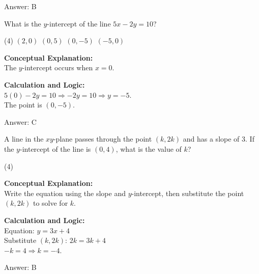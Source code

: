 \documentclass[11pt,paper=a4,answers]{exam}
\begin{document}
\begin{questions}
\begin{solution}
\vspace{15pt}
Answer: \colorbox{yellow!100}{B}
\end{solution}

\vspace{20pt}

\question
What is the $y$-intercept of the line $5x - 2y = 10$?
\begin{tasks}(4)
    \task $(2, 0)$
    \task $(0, 5)$
    \task $(0, -5)$
    \task $(-5, 0)$
\end{tasks}

\begin{solution}
\textbf{Conceptual Explanation:} \\
The $y$-intercept occurs when $x = 0$.

\vspace{10pt}
\textbf{Calculation and Logic:} \\
$5(0) - 2y = 10 \Rightarrow -2y = 10 \Rightarrow y = -5$. \\
The point is $(0, -5)$.

\vspace{15pt}
Answer: \colorbox{yellow!100}{C}
\end{solution}

\vspace{20pt}

\question
A line in the $xy$-plane passes through the point $(k, 2k)$ and has a slope of 3. If the $y$-intercept of the line is $(0, 4)$, what is the value of $k$?
\begin{tasks}(4)
\end{tasks}

\begin{solution}
\textbf{Conceptual Explanation:} \\
Write the equation using the slope and $y$-intercept, then substitute the point $(k, 2k)$ to solve for $k$.

\vspace{10pt}
\textbf{Calculation and Logic:} \\
Equation: $y = 3x + 4$ \\
Substitute $(k, 2k)$: $2k = 3k + 4$ \\
$-k = 4 \Rightarrow k = -4$.

\vspace{15pt}
Answer: \colorbox{yellow!100}{B}
\end{solution}


\end{questions}
\end{document}
